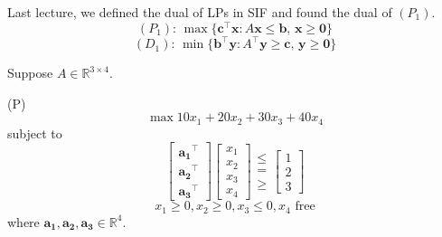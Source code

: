 Last lecture, we defined the dual of LPs in SIF and found the dual of $ (P_1) $.
\[ (P_1):\, \max \{\bm{c}^\top \bm{x}: A \bm{x}\leqslant \bm{b},\,\bm{x}\geqslant  \bm{0}\}\]
\[ (D_1):\, \min\{ \bm{b}^\top \bm{y}: A ^\top \bm{y}\geqslant  \bm{c},\,\bm{y}\geqslant  \bm{0}\}\]

\begin{exbox}
    \begin{example}
        Suppose $ A\in\mathbb{R}^{3\times 4} $.

        (P)
        \[ \max 10x_1+20x_2+30x_3+40x_4 \]
        subject to
        \[ \begin{bmatrix}
                \bm{a_1}^\top \\
                \bm{a_2}^\top \\
                \bm{a_3}^\top
            \end{bmatrix}
            \begin{bmatrix}
                x_1 \\
                x_2 \\
                x_3 \\
                x_4
            \end{bmatrix}
            \begin{matrix}
                \le \\
                =   \\
                \geqslant
            \end{matrix}
            \begin{bmatrix}
                1 \\
                2 \\
                3
            \end{bmatrix}\]
        \[ x_1\geqslant  0, x_2\geqslant  0, x_3\leqslant 0, x_4 \text{ free} \]
        where $ \bm{a_1},\bm{a_2},\bm{a_3}\in \mathbb{R}^{4} $.


\end{example}
\end{exbox}
